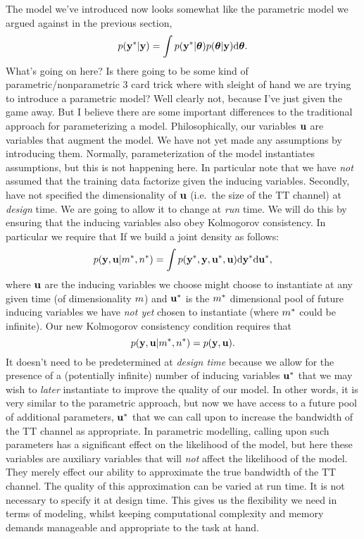 \documentclass[a4paperpaper,]{article}
\begin{document}
The model we've introduced now looks somewhat like the parametric model
we argued against in the previous section, \[
p(\mathbf{ y}^* | \mathbf{ y})=\int
p(\mathbf{ y}^*|\boldsymbol{ \theta})p(\boldsymbol{ \theta}|\mathbf{ y})\text{d}\boldsymbol{ \theta}.
\] What's going on here? Is there going to be some kind of
parametric/nonparametric 3 card trick where with sleight of hand we are
trying to introduce a parametric model? Well clearly not, because I've
just given the game away. But I believe there are some important
differences to the traditional approach for parameterizing a model.
Philosophically, our variables \(\mathbf{ u}\) are variables that
augment the model. We have not yet made any assumptions by introducing
them. Normally, parameterization of the model instantiates assumptions,
but this is not happening here. In particular note that we have
\emph{not} assumed that the training data factorize given the inducing
variables. Secondly, have not specified the dimensionality of
\(\mathbf{ u}\) (i.e.~the size of the TT channel) at \emph{design}
time. We are going to allow it to change at \emph{run} time. We will do
this by ensuring that the inducing variables also obey Kolmogorov
consistency. In particular we require that If we build a joint density
as follows: \begin{align*} 
p(\mathbf{ y}, \mathbf{ u}|m^*,
n^*) = \int p(\mathbf{ y}^*, \mathbf{ y},
\mathbf{ u}^*, \mathbf{ u}) \text{d}\mathbf{ y}^*
\text{d}\mathbf{ u}^*,
\end{align*} where \(\mathbf{ u}\) are the inducing variables we
choose might choose to instantiate at any given time (of dimensionality
\(m\)) and \(\mathbf{ u}^*\) is the \(m^*\)
dimensional pool of future inducing variables we have \emph{not yet}
chosen to instantiate (where \(m^*\) could be infinite). Our
new Kolmogorov consistency condition requires that \[
p(\mathbf{ y}, \mathbf{ u}|m^*,n^*) = p(\mathbf{ y}, \mathbf{ u}).
\] It doesn't need to be predetermined at \emph{design time} because we
allow for the presence of a (potentially infinite) number of inducing
variables \(\mathbf{ u}^*\) that we may wish to \emph{later}
instantiate to improve the quality of our model. In other words, it is
very similar to the parametric approach, but now we have access to a
future pool of additional parameters, \(\mathbf{ u}^*\) that we can
call upon to increase the bandwidth of the TT channel as appropriate. In
parametric modelling, calling upon such parameters has a significant
effect on the likelihood of the model, but here these variables are
auxiliary variables that will \emph{not} affect the likelihood of the
model. They merely effect our ability to approximate the true bandwidth
of the TT channel. The quality of this approximation can be varied at
run time. It is not necessary to specify it at design time. This gives
us the flexibility we need in terms of modeling, whilst keeping
computational complexity and memory demands manageable and appropriate
to the task at hand.
\end{document}
